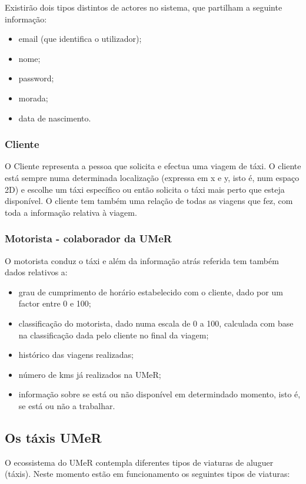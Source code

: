 Existirão dois tipos distintos de actores no sistema, que partilham a seguinte informação:
\begin{itemize}
	\item email (que identifica o utilizador);
	\item nome;
	\item password;
	\item morada;
	\item data de nascimento.
\end{itemize}

\subsubsection{Cliente}
O Cliente representa a pessoa que solicita e efectua uma viagem de táxi. O cliente está sempre numa determinada localização (expressa em x e y, isto é, num espaço 2D) e escolhe um táxi específico ou então solicita o táxi mais perto que esteja disponível. O cliente tem também uma relação de todas as viagens que fez, com toda a informação relativa à viagem.

\subsubsection{Motorista - colaborador da UMeR}
O motorista conduz o táxi e além da informação atrás referida tem também dados relativos a: 
\begin{itemize}
	\item grau de cumprimento de horário estabelecido com o cliente, dado por um factor entre 0 e 100;
	\item classificação do motorista, dado numa escala de 0 a 100, calculada com base na classificação dada pelo cliente no final da viagem;
	\item histórico das viagens realizadas;
	\item número de kms já realizados na UMeR;
	\item informação sobre se está ou não disponível em determindado momento, isto é, se está ou não a trabalhar.
\end{itemize}

\subsection{Os táxis UMeR}

O ecossistema do UMeR contempla diferentes tipos de viaturas de aluguer (táxis). Neste momento estão em funcionamento os seguintes tipos de viaturas:

